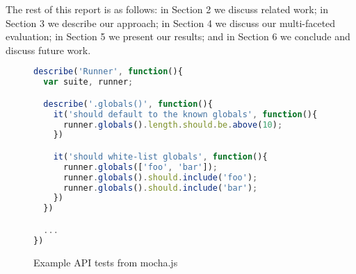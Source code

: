 The rest of this report is as follows: in Section 2 we discuss related
work; in Section 3 we describe our approach; in Section 4 we discuss
our multi-faceted evaluation; in Section 5 we present our results; and
in Section 6 we conclude and discuss future work.

%
%
%
%

%

\begin{figure*}
\begin{lstlisting}[language=javascript]
describe('Runner', function(){
  var suite, runner;

  describe('.globals()', function(){
    it('should default to the known globals', function(){
      runner.globals().length.should.be.above(10);
    })

    it('should white-list globals', function(){
      runner.globals(['foo', 'bar']);
      runner.globals().should.include('foo');
      runner.globals().should.include('bar');
    })
  })

  ...
})
\end{lstlisting}

\caption{Example API tests from mocha.js}
\end{figure*}
